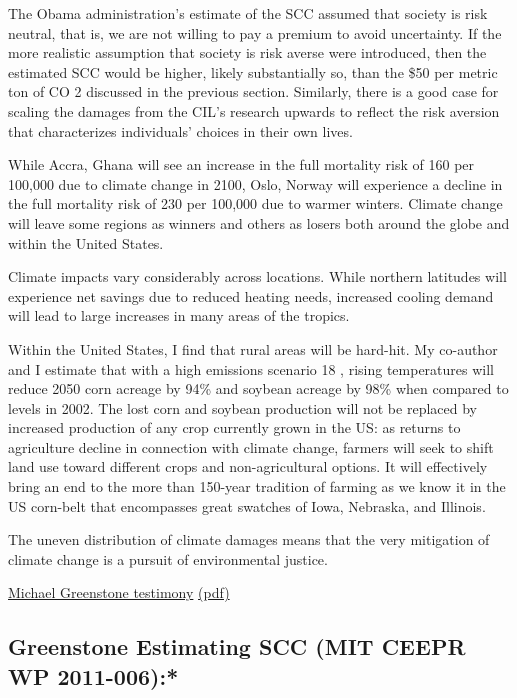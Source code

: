 \documentclass[
]{book}
\begin{document}
The Obama administration's estimate of the SCC assumed that society is
risk neutral, that is, we are not willing to pay a premium to avoid uncertainty. If the more
realistic assumption that society is risk averse were introduced, then the estimated SCC would be
higher, likely substantially so, than the \$50 per metric ton of CO 2 discussed in the previous
section. Similarly, there is a good case for scaling the damages from the CIL's research upwards
to reflect the risk aversion that characterizes individuals' choices in their own lives.

While Accra, Ghana will see an increase in the full mortality
risk of 160 per 100,000 due to climate change in 2100, Oslo, Norway will experience a decline in
the full mortality risk of 230 per 100,000 due to warmer winters.
Climate change
will leave some regions as winners and others as losers both around the globe and within the
United States.

Climate impacts vary considerably
across locations. While northern latitudes will experience net savings due to reduced heating
needs, increased cooling demand will lead to large increases in many areas of the tropics.

Within the United States, I find that rural
areas will be hard-hit. My co-author and I estimate that with a high emissions scenario 18 , rising
temperatures will reduce 2050 corn acreage by 94\% and soybean acreage by 98\% when
compared to levels in 2002. The lost corn and soybean production will not be replaced by
increased production of any crop currently grown in the US: as returns to agriculture decline in
connection with climate change, farmers will seek to shift land use toward different crops and
non-agricultural options. It will effectively bring an end to the more than 150-year tradition of
farming as we know it in the US corn-belt that encompasses great swatches of Iowa, Nebraska,
and Illinois.

The uneven distribution of climate damages means that the very mitigation of climate change is a
pursuit of environmental justice.

\href{http://www.impactlab.org/news-insights/michael-greenstone-testifies-on-the-economic-effects-of-climate-change/}{Michael Greenstone testimony}
\href{pdf/Greenstone_2019_Testimony.pdf}{(pdf)}

\hypertarget{greenstone-estimating-scc-mit-ceepr-wp-2011-006}{%
\subsection{Greenstone Estimating SCC (MIT CEEPR WP 2011-006):*}\label{greenstone-estimating-scc-mit-ceepr-wp-2011-006}}
\end{document}
